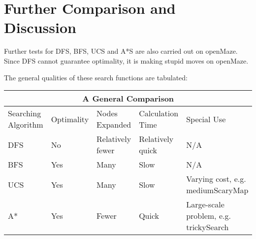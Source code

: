 \documentclass{article}
\begin{document}
\section{Further Comparison and Discussion}
Further tests for DFS, BFS, UCS and A*S are also carried out on openMaze. Since DFS cannot guarantee optimality, it is making stupid moves on openMaze.\par
The general qualities of these search functions are tabulated:
\begin{center}
\begin{tabular}{ |p{2cm}||p{1.5cm}|p{3cm}|p{2.5cm}|p{4cm} | }
 \hline
 \multicolumn{5}{|c|}{A General Comparison} \\
 \hline
 Searching Algorithm & Optimality &  Nodes Expanded & Calculation Time & Special Use\\
 \hline
 DFS & No & Relatively fewer & Relatively quick & N/A\\
 BFS & Yes & Many & Slow & N/A\\
 UCS & Yes & Many & Slow & Varying cost, e.g. mediumScaryMap\\
 A* & Yes & Fewer& Quick & Large-scale problem, e.g. trickySearch\\
 \hline
\end{tabular}
\end{center}
\end{document}
